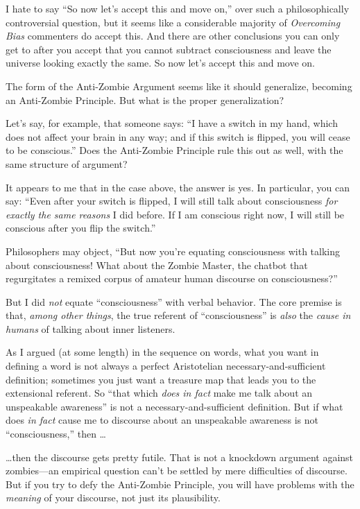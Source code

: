 {
 I hate to say ``So now let's
accept this and move on,'' over such a
philosophically controversial question, but it seems like a
considerable majority of \textit{Overcoming Bias} commenters do accept
this. And there are other conclusions you can only get to after you
accept that you cannot subtract consciousness and leave the universe
looking exactly the same. So now let's accept this and
move on.}

{
 The form of the Anti-Zombie Argument seems like it should
generalize, becoming an Anti-Zombie Principle. But what is the proper
generalization?}

{
 Let's say, for example, that someone says:
``I have a switch in my hand, which does not affect
your brain in any way; and if this switch is flipped, you will cease to
be conscious.'' Does the Anti-Zombie Principle rule
this out as well, with the same structure of argument?}

{
 It appears to me that in the case above, the answer is yes. In
particular, you can say: ``Even after your switch is
flipped, I will still talk about consciousness \textit{for exactly the
same reasons} I did before. If I am conscious right now, I will still
be conscious after you flip the switch.''}

{
 Philosophers may object, ``But now
you're equating consciousness with talking about
consciousness! What about the Zombie Master, the chatbot that
regurgitates a remixed corpus of amateur human discourse on
consciousness?''}

{
 But I did \textit{not} equate
``consciousness'' with verbal
behavior. The core premise is that, \textit{among other things}, the
true referent of ``consciousness''
is \textit{also} the \textit{cause in humans} of talking about inner
listeners.}

{
 As I argued (at some length) in the sequence on words, what you
want in defining a word is not always a perfect Aristotelian
necessary-and-sufficient definition; sometimes you just want a treasure
map that leads you to the extensional referent. So
``that which \textit{does in fact} make me talk about
an unspeakable awareness'' is not a
necessary-and-sufficient definition. But if what does \textit{in fact}
cause me to discourse about an unspeakable awareness is not
``consciousness,'' then \ldots}

{
 \ldots then the discourse gets pretty futile. That is not a
knockdown argument against zombies---an empirical question
can't be settled by mere difficulties of discourse. But
if you try to defy the Anti-Zombie Principle, you will have problems
with the \textit{meaning} of your discourse, not just its
plausibility.}

